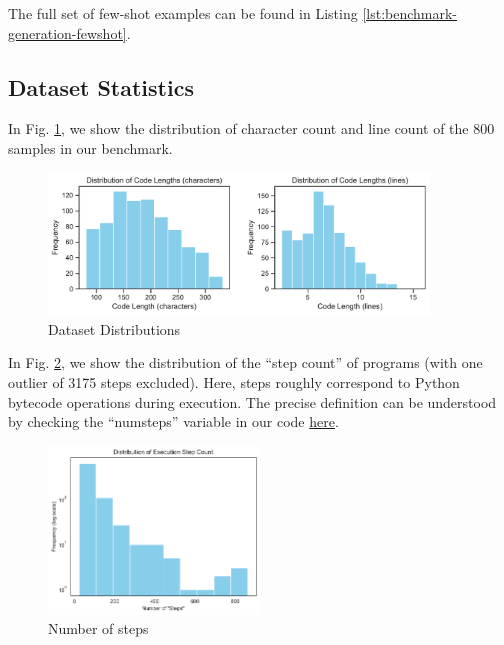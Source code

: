 The full set of few-shot examples can be found in Listing \ref{lst:benchmark-generation-fewshot}.

\subsection{Dataset Statistics} \label{appendix:benchmark-dataset-statistics}

\label{appendix:benchmark-statistics}
In Fig. \ref{fig:dataset-distributions}, we show the distribution of character count and line count of the 800 samples in our benchmark.

\begin{figure}[H]
    \centering
    \includegraphics[width=0.9\textwidth]{figs/benchmark/dataset_distributions.pdf}
    \caption{Dataset Distributions}
    \label{fig:dataset-distributions}
\end{figure}

In Fig. \ref{fig:num-steps}, we show the distribution of the ``step count'' of programs (with one outlier of 3175 steps excluded). Here, steps roughly correspond to Python bytecode operations during execution. The precise definition can be understood by checking the ``numsteps'' variable in our code \href{https://github.com/minimario/cruxeval/blob/main/data/filter/analyze_ops.py}{here}.

\begin{figure}[H]
    \centering
    \includegraphics[width=0.5\textwidth]{figs/benchmark/num_steps.pdf}
    \caption{Number of steps}
    \label{fig:num-steps}
\end{figure}

